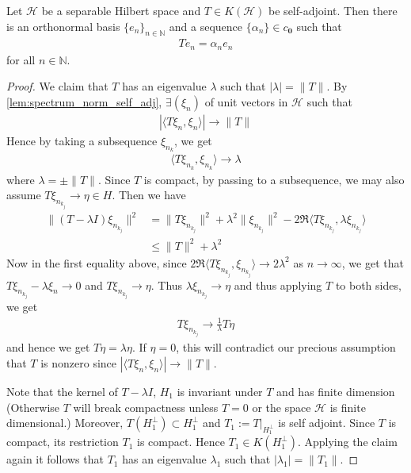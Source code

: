 \begin{theorem}
  Let $\mathcal{H}$ be a separable Hilbert space and $T \in K(\mathcal{H})$ be
  self-adjoint. Then there is an orthonormal basis $ \{ e_n \}_{n \in
  \mathbb{N}}$ and a sequence $\{\alpha_n\} \in c_{\textbf{0}}$ such that
  \begin{align*}
    T e_n = \alpha_n e_n
  \end{align*}
  for all $n \in \mathbb{N}$.
\end{theorem}
\begin{proof}
  We claim that $T$ has an eigenvalue $\lambda$ such that $|\lambda|
  = \|T\|$. By   \autoref{lem:spectrum_norm_self_adj}, $\exists
  (\xi_n)$ of unit vectors in $\mathcal{H}$ such that
  \begin{align*}
    |\langle T  \xi_n , \xi_n \rangle| \to \|T\|
  \end{align*}
  Hence by taking a subsequence $\xi_{n_k}$, we get
  \begin{align*}
    \langle T \xi_{n_k} ,  \xi_{n_k} \rangle \to \lambda
  \end{align*}
  where $\lambda = \pm \|T\|$. Since $T$ is compact, by passing to a
  subsequence, we may also assume $T \xi_{n_{k_j}} \to \eta \in H$.
  Then we have
  \begin{align*}
    \|(T - \lambda I)\xi_{n_{k_j}}\|^2 &= \|T \xi_{n_{k_j}}\|^2 +
    \lambda^2 \|\xi_{n_{k_j}}\|^2 - 2 \Re \langle T \xi_{n_{k_j}}
    , \lambda \xi_{n_{k_j}}  \rangle  \\
    & \le \|T\|^2 + \lambda^2
  \end{align*}
  Now in the first equality above, since $2 \Re \langle T \xi_{n_{k_j}}
  ,\xi_{n_{k_j}}  \rangle \to 2\lambda^2$ as $n \to \infty$, we get
  that $T \xi_{n_{k_j}} - \lambda\xi_n \to 0$ and $T \xi_{n_{k_j}}
  \to \eta$. Thus $\lambda \xi_{n_{k_j}} \to \eta$ and thus applying
  $T$ to both sides, we get
  \begin{align*}
    T \xi_{n_{k_j}} \to \frac{1}{\lambda} T \eta
  \end{align*}
  and hence we get $T \eta = \lambda \eta$. If $\eta= 0$, this will
  contradict our precious assumption that $T$ is nonzero since
  $|\langle T \xi_n , \xi_n \rangle | \to \|T\|$.

  Note that the kernel of $T - \lambda I$, $H_1$ is invariant under
  $T$ and has finite dimension (Otherwise $T$ will break compactness
  unless $T = 0$ or the space $\mathcal{H}$ is finite dimensional.)
  Moreover, $T(H_1^\perp) \subset H_1^\perp$ and $T_1 := T|_{H_1^\perp}$ is
  self adjoint. Since $T$ is compact, its restriction $T_1$ is
  compact. Hence $T_1 \in K(H_1^\perp)$. Applying the claim again it
  follows that $T_1$ has an eigenvalue $\lambda_1$ such that
  $|\lambda_1| = \|T_1\|$.


\end{proof}
